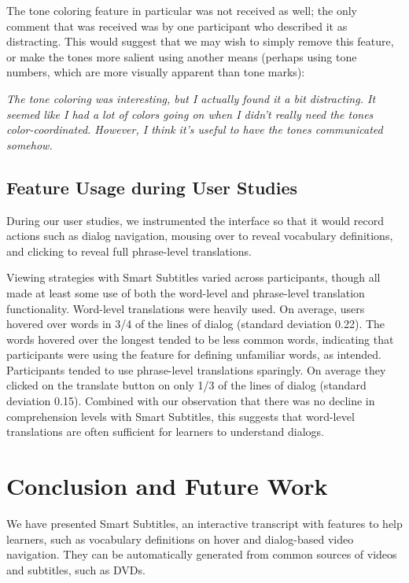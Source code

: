 \documentclass{sigchi}
\begin{document}
The tone coloring feature in particular was not received as well; the only comment that was received was by one participant who described it as distracting. This would suggest that we may wish to simply remove this feature, or make the tones more salient using another means (perhaps using tone numbers, which are more visually apparent than tone marks):
	 	 	
\emph{The tone coloring was interesting, but I actually found it a bit distracting. It seemed like I had a lot of colors going on when I didn't really need the tones color-coordinated. However, I think it's useful to have the tones communicated somehow.}

\subsection{Feature Usage during User Studies}

During our user studies, we instrumented the interface so that it would record actions such as dialog navigation, mousing over to reveal vocabulary definitions, and clicking to reveal full phrase-level translations.

Viewing strategies with Smart Subtitles varied across
participants, though all made at least some use of both
the word-level and phrase-level translation functionality.
Word-level translations were heavily used. On average,
users hovered over words in 3/4 of the lines of dialog
(standard deviation 0.22).
The words hovered over the longest tended to be less
common words, indicating that participants were using
the feature for defining unfamiliar words, as intended.
Participants tended to use phrase-level translations
sparingly. On average they clicked on the translate
button on only 1/3 of the lines of dialog
(standard deviation 0.15).
Combined with our observation that there was no decline in
comprehension levels with Smart Subtitles, this suggests
that word-level translations are often sufficient for
learners to understand dialogs.

\section{Conclusion and Future Work}

We have presented Smart Subtitles, an interactive
transcript with features to help learners, such as vocabulary
definitions on hover and dialog-based video navigation.
They can be automatically generated from
common sources of videos and subtitles, such as DVDs.
\end{document}

